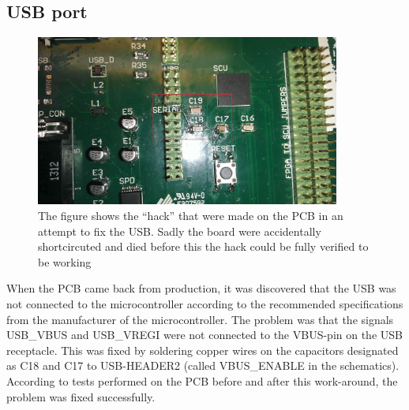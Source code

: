 \subsection{ USB port }

\label{subsec:pcb:problem:usb}
\begin{figure}[H]
\centering
\includegraphics[width=10cm,keepaspectratio]{pcb/vreghack.jpg}
\caption{The figure shows the ``hack'' that were made on the PCB in an attempt to fix the USB. Sadly the board were accidentally shortcircuted and died before this the hack could be fully verified to be working}
\label{figure:vreghack}
\end{figure}

When the PCB came back from production, it was discovered that the USB was not connected to the microcontroller
according to the recommended specifications from the manufacturer of the microcontroller. 
The problem was that the signals USB\_VBUS and USB\_VREGI were not connected to the VBUS-pin on the USB receptacle. This was fixed by soldering copper wires on the capacitors designated as C18 and C17 to USB-HEADER2 (called VBUS\_ENABLE in the schematics).
According to tests performed on the PCB before and after this work-around, the problem was fixed successfully.
